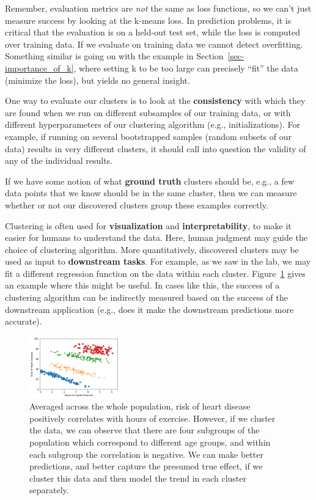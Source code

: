 Remember, evaluation metrics are \textit{not} the same as loss
functions, so we can't just measure success by looking at the k-means
loss. In prediction problems, it is critical that the evaluation is on
a held-out test set, while the loss is computed over training data. If
we evaluate on training data we cannot detect overfitting. Something
similar is going on with the example in
Section~\ref{sec-importance_of_k}, where setting k to be too large can
precisely ``fit'' the data (minimize the loss), but yields no general
insight.

One way to evaluate our clusters is to look at the
\textbf{consistency} with which they are found when we run on
different subsamples of our training data, or with different
hyperparameters of our clustering algorithm (e.g.,
initializations). For example, if running on several bootstrapped
samples (random subsets of our data) results in very different
clusters, it should call into question the validity of any of the
individual results.

If we have some notion of what \textbf{ground truth} clusters should
be, e.g., a few data points that we know should be in the same
cluster, then we can measure whether or not our discovered clusters
group these examples correctly.

Clustering is often used for \textbf{visualization} and
\textbf{interpretability}, to make it easier for humans to understand
the data. Here, human judgment may guide the choice of clustering
algorithm. More quantitatively, discovered clusters may be used as input to
\textbf{downstream tasks}. For example, as we saw in the lab, we may fit a different
regression function on the data within each
cluster. Figure~\ref{fig:simpsons_color} gives
an example where this might be useful. In cases like this, the success
of a clustering algorithm can be indirectly measured based on the
success of the downstream application (e.g., does it make the
downstream predictions more accurate).

\begin{figure}[h]
  \centering
  \includegraphics[width=0.35\textwidth]{figures/simpsons_color.png}
  \caption{Averaged across the whole population, risk of heart
    disease positively correlates with hours of exercise. However,
    if we cluster the data, we can observe that there are four
    subgroups of the population which correspond to different age
    groups, and within each subgroup the correlation is negative. We
    can make better predictions, and better capture the presumed
    true effect, if we cluster this data and then model the trend in
    each cluster separately.}
  \label{fig:simpsons_color}
\end{figure}

